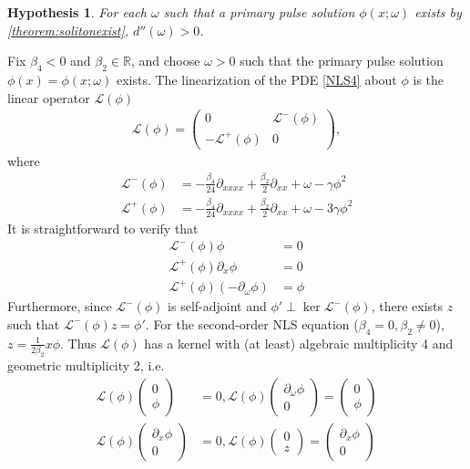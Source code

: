 \documentclass[12pt]{article}
\def\R{{\mathbb R}}
\def\calL{{\mathcal L}}
\newtheorem{hypothesis}{Hypothesis}
\begin{document}
\begin{hypothesis}\label{hyp:dccpos}
For each $\omega$ such that a primary pulse solution $\phi(x; \omega)$ exists by \cref{theorem:solitonexist}, $d''(\omega) > 0$.
\end{hypothesis}

Fix $\beta_4 < 0$ and $\beta_2 \in \R$, and choose $\omega > 0$ such that the primary pulse solution $\phi(x) = \phi(x; \omega)$ exists. The linearization of the PDE \cref{NLS4} about $\phi$ is the linear operator $\calL(\phi)$
\begin{align}\label{defLphi}
\calL(\phi) = 
\begin{pmatrix}
0 & \calL^-(\phi) \\
-\calL^+(\phi) & 0
\end{pmatrix},
\end{align}
where
\begin{align*}
\calL^-(\phi) &= -\frac{\beta_4}{24} \partial_{xxxx} + \frac{\beta_2}{2} \partial_{xx} + \omega - \gamma \phi^2 \\
\calL^+(\phi) &= -\frac{\beta_4}{24} \partial_{xxxx} + \frac{\beta_2}{2} \partial_{xx} + \omega - 3 \gamma \phi^2
\end{align*}
It is straightforward to verify that 
\begin{align*}
\calL^-(\phi) \phi &= 0 \\
\calL^+(\phi) \partial_x \phi &= 0 \\
\calL^+(\phi)(-\partial_\omega \phi) &= \phi
\end{align*}
Furthermore, since $\calL^-(\phi)$ is self-adjoint and $\phi' \perp \ker \calL^-(\phi)$, there exists $z$ such that $\calL^-(\phi) z = \phi'$. For the second-order NLS equation ($\beta_4 = 0, \beta_2 \neq 0$), $z = \frac{1}{2 \beta_2} x \phi$. Thus $\calL(\phi)$ has a kernel with (at least) algebraic multiplicity 4 and geometric multiplicity 2, i.e.
\begin{equation}\label{Lphikernel}
\begin{aligned}
\calL(\phi)\begin{pmatrix}0 \\ \phi \end{pmatrix} &= 0, 
\calL(\phi)\begin{pmatrix} \partial_\omega \phi \\ 0 \end{pmatrix} = \begin{pmatrix}0 \\ \phi \end{pmatrix} \\
\calL(\phi)\begin{pmatrix}\partial_x\phi \\ 0 \end{pmatrix} &= 0, 
\calL(\phi)\begin{pmatrix} 0 \\ z \end{pmatrix} = \begin{pmatrix}\partial_x\phi \\ 0 \end{pmatrix} 
\end{aligned}
\end{equation}
\end{document}

